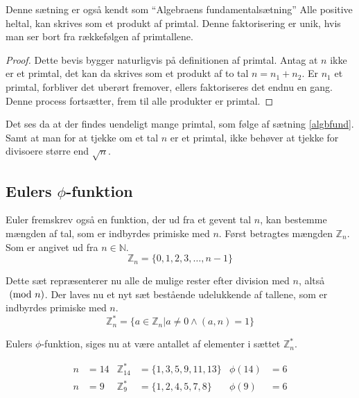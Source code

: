 %



\begin{sent}%
    Denne sætning er også kendt som ``Algebraens fundamentalsætning''
    Alle positive heltal, kan skrives som et produkt af primtal.
    Denne faktorisering er unik, hvis man ser bort fra rækkefølgen af primtallene.
    \label{algbfund}
\end{sent}

\begin{proof}
    Dette bevis bygger naturligvis på definitionen af primtal.
    Antag at \(n\) ikke er et primtal, det kan da skrives som et produkt af to tal \(n = n_1 + n_2\).
    Er \(n_1\) et primtal, forbliver det uberørt fremover, ellers faktoriseres det endnu en gang.
    Denne process fortsætter, frem til alle produkter er primtal.
\end{proof}

Det ses da at der findes uendeligt mange primtal, som følge af sætning \ref{algbfund}.
Samt at man for at tjekke om et tal \(n\) er et primtal, ikke behøver at tjekke for divisoere større end \(\sqrt{n}\).


\subsection{Eulers \texorpdfstring{\(\phi\)}{Lg}-funktion}
Euler fremskrev også en funktion, der ud fra et gevent tal \(n\), kan bestemme mængden af tal, som er indbyrdes primiske med \(n\).
Først betragtes mængden \(\mathbb{Z}_n\). Som er angivet ud fra \(n \in \mathbb{N}\).
\[\mathbb{Z}_n = \{0, 1, 2, 3, \hdots, n-1 \}\]

Dette sæt repræsenterer nu alle de mulige rester efter division med \(n\), altså \(\ (\mathrm{mod}\ n)\).
Der laves nu et nyt sæt bestående udelukkende af tallene, som er indbyrdes primiske med \(n\).
\[\mathbb{Z}_n^* = \{a \in \mathbb{Z}_n | a \neq 0 \land (a, n) = 1\}\]

\begin{definition}
    Eulers \(\phi\)-funktion, siges nu at være antallet af elementer i sættet \(\mathbb{Z}_n^*\).
\end{definition}

\begin{eks}
    \mbox{}\vspace*{-1.5em}
    \begin{align*}
        n &= 14 & \mathbb{Z}_{14}^*  &= \{1, 3, 5, 9, 11, 13 \} & \phi(14) &= 6\\
        n &= 9  & \mathbb{Z}_9^*     &= \{1, 2, 4, 5, 7, 8\}    & \phi(9)  &= 6
    \end{align*}
\end{eks}

